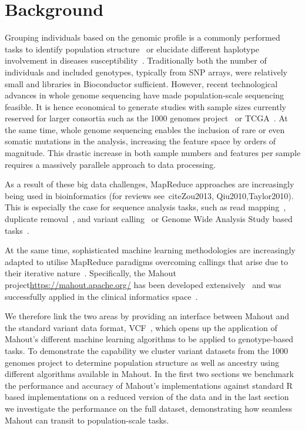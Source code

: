 \documentclass[twocolumn]{bmcart}%
\begin{document}
\section*{Background}
Grouping individuals based on the genomic profile is a commonly performed tasks to identify population structure~\cite{Gao2007} or elucidate different haplotype involvement in diseases susceptibility~\cite{Laitman2013}.  Traditionally both the number of individuals and included genotypes, typically from SNP arrays, were relatively small and libraries in Bioconductor sufficient. However, recent technological advances in whole genome sequencing have made population-scale sequencing feasible. It is hence economical to generate studies with sample sizes currently reserved for larger consortia such as the 1000 genomes project~\cite{1KG2012} or TCGA~\cite{TCGA2013}. At the same time, whole genome sequencing enables the inclusion of rare or even somatic mutations in the analysis, increasing the feature space by orders of magnitude. This drastic increase in both sample numbers and features per sample requires a massively parallele approach to data processing. 

As a result of these big data challenges, MapReduce approaches are increasingly being used in bioinformatics (for reviews see~cite{Zou2013, Qiu2010,Taylor2010}). This is especially the case for sequence analysis tasks, such as read mapping~\cite{Schatz2009}, duplicate removal~\cite{Jourdren2012}, and variant calling~\cite{Langmead2009, McKenna2010} or Genome Wide Analysis Study based tasks~\cite{Huang2013, Guo2014}.

At the same time, sophisticated machine learning methodologies are increasingly adapted to utilise MapReduce paradigms overcoming callings that arise due to their iterative nature~\cite{Chu2009}. Specifically, the Mahout project\url{https://mahout.apache.org/} has been developed extensively~\cite{Ranger2007, Owen2011} and was successfully applied in the clinical informatics space~\cite{Dong2013}.

We therefore link the two areas by providing an interface between Mahout and the standard variant data format, VCF~\cite{1KG2012}, which opens up the application of Mahout's different machine learning algorithms to be applied to genotype-based tasks.   
To demonstrate the capability we cluster variant datasets from the 1000 genomes project to determine population structure as well as ancestry using different algorithms available in Mahout. In the first two sections we benchmark the performance and accuracy of Mahout's implementations against standard R based implementations on a reduced version of the data and in the last section we investigate the performance on the full dataset, demonstrating how seamless Mahout can transit to population-scale tasks.   
\end{document}
